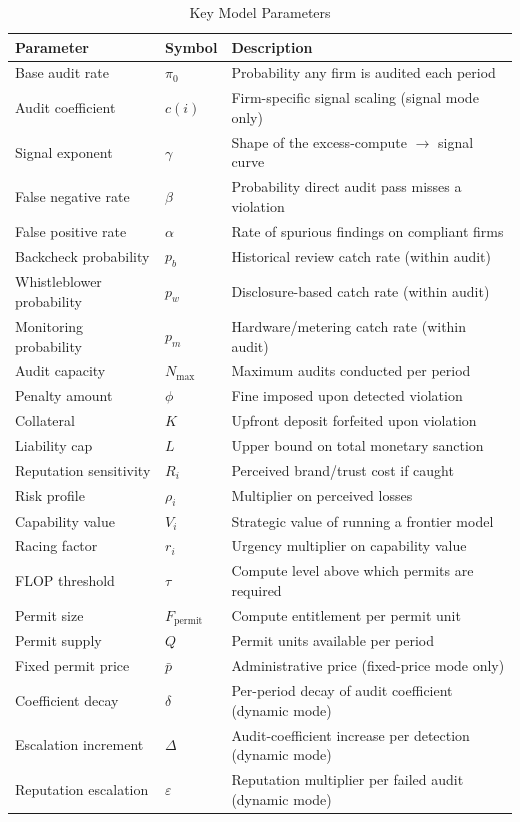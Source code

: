 \begin{table}[h]
\centering
\caption{Key Model Parameters}
\label{tab:parameters}
\begin{tabular}{@{}llp{7cm}@{}}
\toprule
\textbf{Parameter} & \textbf{Symbol} & \textbf{Description} \\
\midrule
Base audit rate & $\pi_0$ & Probability any firm is audited each period \\
Audit coefficient & $c(i)$ & Firm-specific signal scaling (signal mode only) \\
Signal exponent & $\gamma$ & Shape of the excess-compute $\to$ signal curve \\
False negative rate & $\beta$ & Probability direct audit pass misses a violation \\
False positive rate & $\alpha$ & Rate of spurious findings on compliant firms \\
Backcheck probability & $p_b$ & Historical review catch rate (within audit) \\
Whistleblower probability & $p_w$ & Disclosure-based catch rate (within audit) \\
Monitoring probability & $p_m$ & Hardware/metering catch rate (within audit) \\
Audit capacity & $N_{\max}$ & Maximum audits conducted per period \\
Penalty amount & $\phi$ & Fine imposed upon detected violation \\
Collateral & $K$ & Upfront deposit forfeited upon violation \\
Liability cap & $L$ & Upper bound on total monetary sanction \\
Reputation sensitivity & $R_i$ & Perceived brand/trust cost if caught \\
Risk profile & $\rho_i$ & Multiplier on perceived losses \\
Capability value & $V_i$ & Strategic value of running a frontier model \\
Racing factor & $r_i$ & Urgency multiplier on capability value \\
FLOP threshold & $\tau$ & Compute level above which permits are required \\
Permit size & $F_{\text{permit}}$ & Compute entitlement per permit unit \\
Permit supply & $Q$ & Permit units available per period \\
Fixed permit price & $\bar{p}$ & Administrative price (fixed-price mode only) \\
Coefficient decay & $\delta$ & Per-period decay of audit coefficient (dynamic mode) \\
Escalation increment & $\Delta$ & Audit-coefficient increase per detection (dynamic mode) \\
Reputation escalation & $\varepsilon$ & Reputation multiplier per failed audit (dynamic mode) \\
\bottomrule
\end{tabular}
\end{table}
